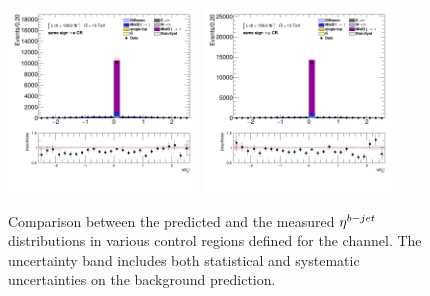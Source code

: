 \begin{figure}[!htp]
\begin{center}
			\includegraphics[width=0.45\textwidth]{chapters/chapter6_HPlus/images/taulep/bjet_0_eta_SS_TAUEL.png} 
			\includegraphics[width=0.45\textwidth]{chapters/chapter6_HPlus/images/taulep/bjet_0_eta_SS_TAUMU.png} \\
			\end{center}
			\caption{
			Comparison between the predicted and the measured $\eta^{b-jet}$ distributions in various control regions defined for the \taulep channel. The uncertainty band includes both statistical and systematic uncertainties on the background prediction. 
			}
			\label{fig:bkg-eta-bjet-taulep}
		\end{figure}

